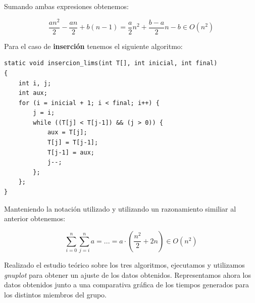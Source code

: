 \documentclass[11pt,a4paper]{article}
\begin{document}
Sumando ambas expresiones obtenemos:

$$\frac{an^2}{2} - \frac{an}{2}+ b(n-1) = \frac{a}{2}n^2+\frac{b-a}{2}n - b \in O(n^2)$$



Para el caso de \textbf{inserción} tenemos el siguiente algoritmo:

\begin{lstlisting}
static void insercion_lims(int T[], int inicial, int final)
{
	int i, j;
	int aux;
	for (i = inicial + 1; i < final; i++) {
		j = i;
		while ((T[j] < T[j-1]) && (j > 0)) {
			aux = T[j];
			T[j] = T[j-1];
			T[j-1] = aux;
			j--;
		};
	};
}
\end{lstlisting}

Manteniendo la notación utilizado y utilizando un razonamiento similiar al anterior obtenemos:

$$\sum_{i=0}^{n} \sum_{j=i}^{n} a = ... = a \cdot (\frac{n^2}{2} + 2n) \in O(n^2)$$

Realizado el estudio teórico sobre los tres algoritmos, ejecutamos y utilizamos \emph{gnuplot} para obtener un ajuste de los datos obtenidos. Representamos ahora los datos obtenidos junto a una comparativa gráfica de los tiempos generados para los distintos miembros del grupo.
\end{document}
